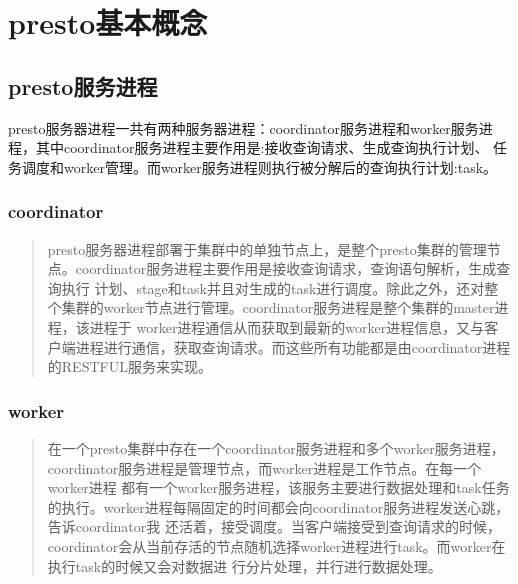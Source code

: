 \documentclass[letterpaper,10pt,english]{sphinxmanual}
\begin{document}
\section{presto基本概念}
\label{\detokenize{overview/concept:presto}}\label{\detokenize{overview/concept::doc}}

\subsection{presto服务进程}
\label{\detokenize{overview/concept:id1}}
\begin{sphinxVerbatim}[commandchars=\\\{\}]
presto服务器进程一共有两种服务器进程：coordinator服务进程和worker服务进程，其中coordinator服务进程主要作用是:接收查询请求、生成查询执行计划、
任务调度和worker管理。而worker服务进程则执行被分解后的查询执行计划:task。
\end{sphinxVerbatim}

\noindent{}


\subsubsection{coordinator}
\label{\detokenize{overview/concept:coordinator}}\begin{quote}

presto服务器进程部署于集群中的单独节点上，是整个presto集群的管理节点。coordinator服务进程主要作用是接收查询请求，查询语句解析，生成查询执行
计划、stage和task并且对生成的task进行调度。除此之外，还对整个集群的worker节点进行管理。coordinator服务进程是整个集群的master进程，该进程于
worker进程通信从而获取到最新的worker进程信息，又与客户端进程进行通信，获取查询请求。而这些所有功能都是由coordinator进程的RESTFUL服务来实现。
\end{quote}


\subsubsection{worker}
\label{\detokenize{overview/concept:worker}}\begin{quote}

在一个presto集群中存在一个coordinator服务进程和多个worker服务进程，coordinator服务进程是管理节点，而worker进程是工作节点。在每一个worker进程
都有一个worker服务进程，该服务主要进行数据处理和task任务的执行。worker进程每隔固定的时间都会向coordinator服务进程发送心跳，告诉coordinator我
还活着，接受调度。当客户端接受到查询请求的时候，coordinator会从当前存活的节点随机选择worker进程进行task。而worker在执行task的时候又会对数据进
行分片处理，并行进行数据处理。
\end{quote}
\end{document}

